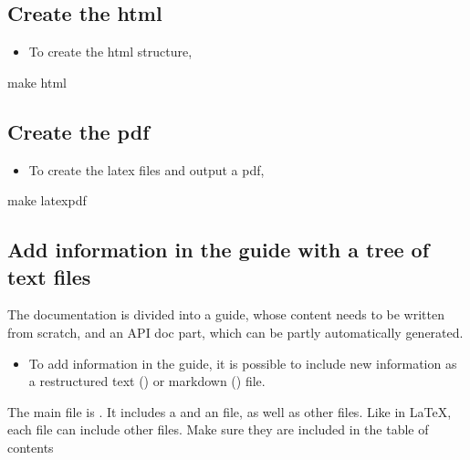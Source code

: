 \documentclass[letterpaper,10pt,english]{sphinxmanual}
\begin{document}
\subsection{Create the html}
\label{\detokenize{README-docs:create-the-html}}\begin{itemize}
\item {} 
To create the html structure,

\end{itemize}

\begin{sphinxVerbatim}[commandchars=\\\{\}]
make html
\end{sphinxVerbatim}


\subsection{Create the pdf}
\label{\detokenize{README-docs:create-the-pdf}}\begin{itemize}
\item {} 
To create the latex files and output a pdf,

\end{itemize}

\begin{sphinxVerbatim}[commandchars=\\\{\}]
make latexpdf
\end{sphinxVerbatim}


\subsection{Add information in the guide with a tree of text files}
\label{\detokenize{README-docs:add-information-in-the-guide-with-a-tree-of-text-files}}
The documentation is divided into a guide, whose content needs to be written
from scratch, and an API doc part, which can be partly automatically generated.
\begin{itemize}
\item {} 
To add information in the guide, it is possible to include new information
as a restructured text () or markdown () file.

\end{itemize}

The main file is . It includes a  and an 
file, as well as other files. Like in LaTeX, each file can include other files.
Make sure they are included in the table of contents
\end{document}
